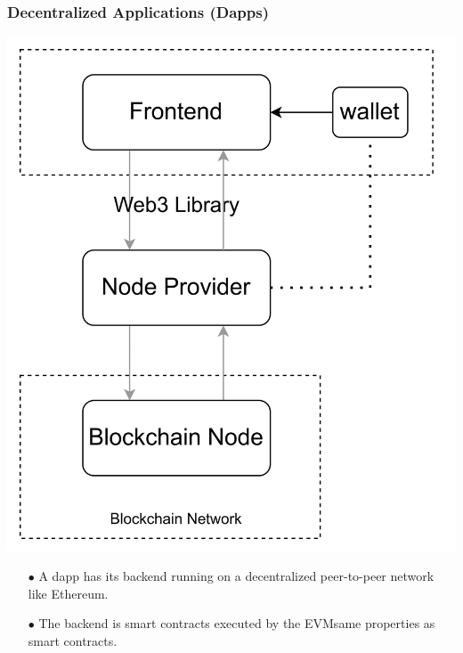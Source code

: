 \documentclass{beamer}
\begin{document}
\begin{frame}
\frametitle{Decentralized Applications (Dapps)}
\noindent\begin{minipage}{0.45\textwidth}%
	\includegraphics[width=\linewidth]{../images/dappcomponents1}
\end{minipage}%
\begin{minipage}{0.55\textwidth}\raggedleft
	\begin{itemize}
	\item[$\bullet$] A dapp has its backend running on a decentralized peer-to-peer network like Ethereum.
	\linebreak
	\linebreak
	\item[$\bullet$] The backend is smart contracts executed by the EVM\rightarrow same properties as smart contracts.
\end{itemize}

\end{minipage}	
	
	


\end{frame}
\end{document}
